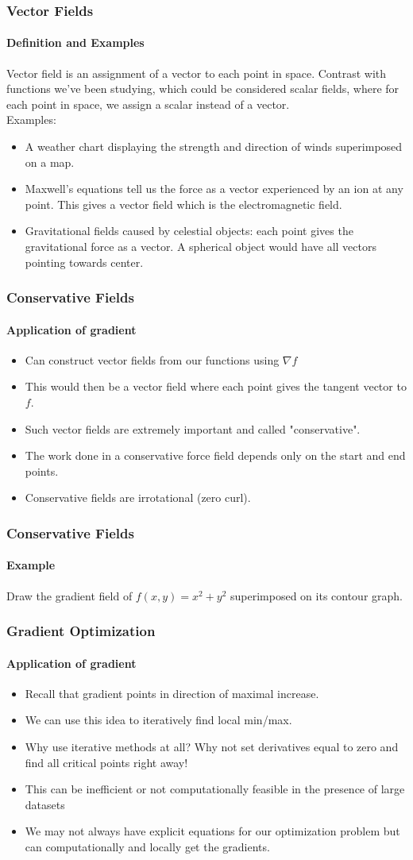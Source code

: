 \documentclass[xcolor=svgnames]{beamer}
\begin{document}
\begin{frame}
\frametitle{Vector Fields}
\framesubtitle{Definition and Examples}
Vector field is an assignment of a vector to each point in space. Contrast with functions we've been studying, which could be considered scalar fields, where for each point in space, we assign a scalar instead of a vector. \\
Examples:
\begin{itemize}
\item A weather chart displaying the strength and direction of winds superimposed on a map. 
\item Maxwell's equations tell us the force as a vector experienced by an ion at any point. This gives a vector field which is the electromagnetic field. 
\item Gravitational fields caused by celestial objects: each point gives the gravitational force as a vector. A spherical object would have all vectors pointing towards center. 
\end{itemize}
\end{frame}
\begin{frame}
\frametitle{Conservative Fields}
\framesubtitle{Application of gradient}
\begin{itemize}
\item Can construct vector fields from our functions using $\nabla f$
\item This would then be a vector field where each point gives the tangent vector to $f$. 
\item Such vector fields are extremely important and called "conservative". 
\item The work done in a conservative force field depends only on the start and end points. 
\item Conservative fields are irrotational (zero curl). 
\end{itemize}
\end{frame}
\begin{frame}
\frametitle{Conservative Fields}
\framesubtitle{Example}
Draw the gradient field of $f(x,y) = x^2 + y^2$ superimposed on its contour graph. 
\end{frame}
\begin{frame}
\frametitle{Gradient Optimization}
\framesubtitle{Application of gradient}
\begin{itemize}
\item Recall that gradient points in direction of maximal increase. 
\item We can use this idea to iteratively find local min/max. 
\item Why use iterative methods at all? Why not set derivatives equal to zero and find all critical points right away!
\item This can be inefficient or not computationally feasible in the presence of large datasets
\item We may not always have explicit equations for our optimization problem but can computationally and locally get the gradients. 
\end{itemize}
\end{frame}
\end{document}
